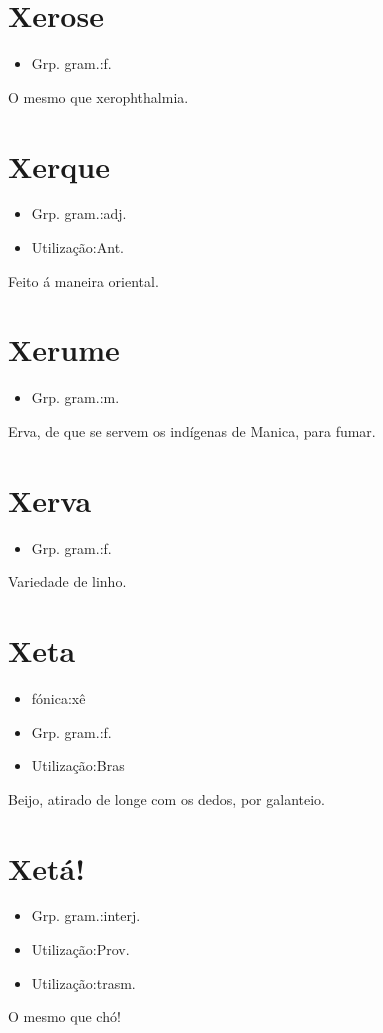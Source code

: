 \section{Xerose}
\begin{itemize}
\item {Grp. gram.:f.}
\end{itemize}
O mesmo que \textunderscore xerophthalmia\textunderscore .
\section{Xerque}
\begin{itemize}
\item {Grp. gram.:adj.}
\end{itemize}
\begin{itemize}
\item {Utilização:Ant.}
\end{itemize}
Feito á maneira oriental.
\section{Xerume}
\begin{itemize}
\item {Grp. gram.:m.}
\end{itemize}
Erva, de que se servem os indígenas de Manica, para fumar.
\section{Xerva}
\begin{itemize}
\item {Grp. gram.:f.}
\end{itemize}
Variedade de linho.
\section{Xeta}
\begin{itemize}
\item {fónica:xê}
\end{itemize}
\begin{itemize}
\item {Grp. gram.:f.}
\end{itemize}
\begin{itemize}
\item {Utilização:Bras}
\end{itemize}
Beijo, atirado de longe com os dedos, por galanteio.
\section{Xetá!}
\begin{itemize}
\item {Grp. gram.:interj.}
\end{itemize}
\begin{itemize}
\item {Utilização:Prov.}
\end{itemize}
\begin{itemize}
\item {Utilização:trasm.}
\end{itemize}
O mesmo que \textunderscore chó\textunderscore !
